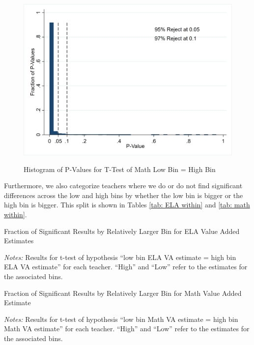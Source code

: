 \documentclass[letterpaper,12pt]{article}
\begin{document}
\begin{figure}[ht]
    \centering
    \caption{Histogram of P-Values for T-Test of Math Low Bin = High Bin}
    \includegraphics[width=\textwidth]{figures/Math_T_Test_Hist.png}
    \label{fig: math ttest}
\end{figure}

Furthermore, we also categorize teachers where we do or do not find significant differences across the low and high bins by whether the low bin is bigger or the high bin is bigger. This split is shown in Tables \ref{tab: ELA within} and \ref{tab: math within}.

\begin{table}[ht]
    \centering
    \caption{Fraction of Significant Results by Relatively Larger Bin for ELA Value Added Estimates}
    
    \label{tab: ELA within}
    \caption*{\scriptsize \textit{Notes:} Results for t-test of hypothesis ``low bin ELA VA estimate = high bin ELA VA estimate'' for each teacher. ``High'' and ``Low'' refer to the estimates for the associated bins.}
\end{table}


\begin{table}[ht]
    \centering
    \caption{Fraction of Significant Results by Relatively Larger Bin for Math Value Added Estimate}
    
    \label{tab: math within}
    \caption*{\scriptsize \textit{Notes:} Results for t-test of hypothesis ``low bin Math VA estimate = high bin Math VA estimate'' for each teacher. ``High'' and ``Low'' refer to the estimates for the associated bins.}
\end{table}
\end{document}
